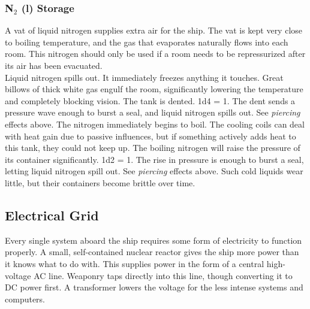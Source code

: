 \documentclass[a4paper]{article}
\begin{document}
\vspace{-0.5cm} \hspace{-18pt} \subsubsection{N$_2$ (l) Storage} \label{life_n2_storage} \vspace{-0.2cm}
A vat of liquid nitrogen supplies extra air for the ship. The vat is kept very close to boiling temperature, and the gas that evaporates naturally flows into each room. This nitrogen should only be used if a room needs to be repressurized after its air has been evacuated.
\\ \pbhw
{Liquid nitrogen spills out. It immediately freezes anything it touches. Great billows of thick white gas engulf the room, significantly lowering the temperature and completely blocking vision.}
{The tank is dented. \newline 1d4 = 1. The dent sends a pressure wave enough to burst a seal, and liquid nitrogen spills out. See \textit{piercing} effects above.}
{The nitrogen immediately begins to boil. The cooling coils can deal with heat gain due to passive influences, but if something actively adds heat to this tank, they could not keep up. The boiling nitrogen will raise the pressure of its container significantly. \newline 1d2 = 1. The rise in pressure is enough to burst a seal, letting liquid nitrogen spill out. See \textit{piercing} effects above.}
{Such cold liquids wear little, but their containers become brittle over time.}



\subsection{Electrical Grid} \label{grid}

Every single system aboard the ship requires some form of electricity to function properly. A small, self-contained nuclear reactor gives the ship more power than it knows what to do with. This supplies power in the form of a central high-voltage AC line. Weaponry taps directly into this line, though converting it to DC power first. A transformer lowers the voltage for the less intense systems and computers.
\end{document}
